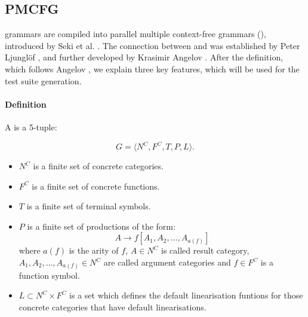 \subsection{PMCFG}
\label{sec:PMCFG}

\gf{} grammars are compiled into parallel multiple context-free
grammars (\pmcfg), introduced by Seki et al. \cite{seki91pmcfg}. The
connection between \gf{} and \pmcfg{} was established by Peter
Ljunglöf \cite{ljunglof2004}, and further developed by Krasimir
Angelov \cite{angelov2010phd}. 
After the definition, which follows Angelov \cite{angelov2010phd}, we
explain three key features, which will be used for the test suite generation.

\paragraph{Definition} A \pmcfg{} is a 5-tuple:

\[
 G = \langle N^C, F^C, T, P, L \rangle.
\]

\begin{itemize}
\item $N^C$ is a finite set of concrete categories.

\item $F^C$ is a finite set of concrete functions. %


\item $T$ is a finite set of terminal symbols.

\item $P$ is a finite set of productions of the form:
$$
A \rightarrow f[A_1,A_2,\dots,A_{a(f)}]
$$
where $a(f)$ is the arity of $f$, $A \in N^C$ is called result category, $A_1,A_2,\dots,A_{a(f)} \in N^C$ are called argument categories and $f \in F^C$ is a function symbol.
\item $L \subset N^C \times F^C$ is a set which defines the default linearisation funtions for those concrete categories that have default linearisations. 
\end{itemize}

